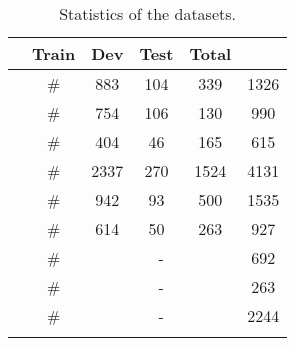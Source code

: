 \documentclass[letterpaper]{article} \usepackage{aaai19}  \usepackage{times}  \usepackage{helvet}  \usepackage{courier}  \usepackage{url}  \usepackage{graphicx}  \frenchspacing  \setlength{\pdfpagewidth}{8.5in}  \setlength{\pdfpageheight}{11in}
\begin{document}
\begin{table}[]
    \centering
    \begin{tabular}{cc|c|c|c|c}
    \Xhline{3\arrayrulewidth}
      \multicolumn{2}{c|}{Dataset} & Train & Dev & Test & Total  \\ \hline
        \multirow{3}{*}{} & \#  & 883 & 104 & 339 & 1326 \\ 
        & \#  & 754 & 106 & 130 & 990 \\ 
        & \#  & 404 & 46 & 165 & 615 \\ \hline
        \multirow{3}{*}{} & \#  & 2337 & 270 & 1524 & 4131 \\ 
        & \#  & 942 & 93 & 500 & 1535\\ 
        & \#  & 614 & 50 & 263 & 927 \\ \hline
        \multirow{3}{*}{} & \#  & \multicolumn{3}{c|}{-} & 692 \\ 
        & \#  & \multicolumn{3}{c|}{-} & 263  \\ 
        & \#  & \multicolumn{3}{c|}{-} & 2244  \\ \Xhline{3\arrayrulewidth}
    \end{tabular}
    \caption{Statistics of the datasets.}
    \label{tab:dataset}
\end{table}
\end{document}
